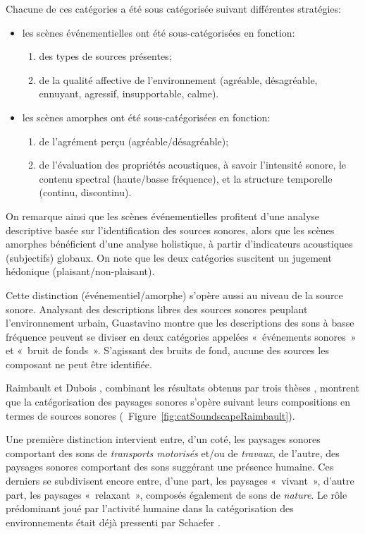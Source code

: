 Chacune de ces catégories a été sous catégorisée suivant différentes stratégies:

\begin{itemize}
\item les scènes événementielles ont été sous-catégorisées en fonction:
\begin{enumerate}
\item des types de sources présentes;
\item de la qualité affective de l'environnement (agréable, désagréable, ennuyant, agressif, insupportable, calme).
\end{enumerate}
\item les scènes amorphes ont été sous-catégorisées en fonction:
\begin{enumerate}
\item de l'agrément perçu (agréable/désagréable);
\item de l'évaluation des propriétés acoustiques, à savoir l'intensité sonore, le contenu spectral (haute/basse fréquence), et la structure temporelle (continu, discontinu).
\end{enumerate}
\end{itemize}

On remarque ainsi que les scènes événementielles profitent d'une analyse descriptive basée sur l'identification des sources sonores, alors que les scènes amorphes bénéficient d'une analyse holistique, à partir d'indicateurs acoustiques (subjectifs) globaux. On note que les deux catégories suscitent un jugement hédonique (plaisant/non-plaisant).

Cette distinction (événementiel/amorphe) s'opère aussi au niveau de la source sonore. Analysant des descriptions libres des sources sonores peuplant l’environnement urbain, Guastavino \citep{guastavino2006ideal} montre que les descriptions des sons à basse fréquence peuvent se diviser en deux catégories appelées «~événements sonores~» et «~bruit de fonds~». S'agissant des bruits de fond, aucune des sources les composant ne peut être identifiée.

Raimbault et Dubois \citep{raimbault2005urban}, combinant les résultats obtenus par trois thèses \citep{maffiolo_caracterisation_1999, raimbault2002simulation, guastavino_etude_2003}, montrent que la catégorisation des paysages sonores s'opère suivant leurs compositions en termes de sources sonores (\cf~Figure~\ref{fig:catSoundscapeRaimbault}). 

Une première distinction intervient entre, d'un coté, les paysages sonores comportant des sons de \emph{transports motorisés} et/ou de \emph{travaux}, de l'autre, des paysages sonores comportant des sons suggérant une présence humaine. Ces derniers se subdivisent encore entre, d'une part, les paysages «~vivant~», d'autre part, les paysages «~relaxant~», composés également de sons de \emph{nature}. Le rôle prédominant joué par l'activité humaine dans la catégorisation des environnements était déjà pressenti par Schaefer \citep{schafer1977tuning}.

